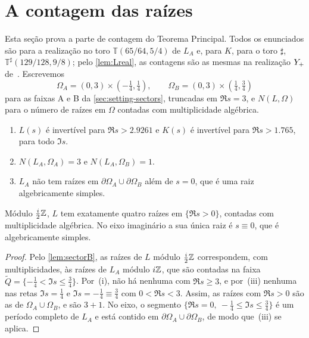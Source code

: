 \section{A contagem das raízes}\label{sec:counting}

Esta seção prova a parte de contagem do Teorema Principal. Todos os enunciados são para a realização no toro
$\mathbb T(65/64,5/4)$ de $L_A$ e, para $K$, para o toro $\sharp$, $\mathbb T^\sharp(129/128,9/8)$; pelo
\cref{lem:Lreal}, as contagens são as mesmas na realização $Y_{+}$ de~\cite{RT2019}. Escrevemos
\[
  \Omega_A=(0,3)\times(-\tfrac14,\tfrac14),\qquad \Omega_B=(0,3)\times(\tfrac14,\tfrac34)
\]
para as faixas A e B da \cref{sec:setting-sectors}, truncadas em $\Re s=3$, e $N(L,\Omega)$ para o
número de raízes em $\Omega$ contadas com multiplicidade algébrica.

\begin{theorem}[Contagens]\label{thm:counts}
\begin{enumerate}[label=\textup{(\roman*)},leftmargin=*]
\item $L(s)$ é invertível para $\Re s>2.9261$ e $K(s)$ é invertível para $\Re s>1.765$, para todo $\Im s$.
\item $N(L_A,\Omega_A)=3$ e $N(L_A,\Omega_B)=1$.
\item $L_A$ não tem raízes em $\partial\Omega_A\cup\partial\Omega_B$ além de $s=0$, que é uma raiz
  algebricamente simples.
\end{enumerate}
\end{theorem}

\begin{corollary}\label{cor:four}
Módulo $\tfrac i2\mathbb{Z}$, $L$ tem exatamente quatro raízes em $\{\Re s>0\}$, contadas com multiplicidade algébrica. No
eixo imaginário a sua única raiz é $s\equiv0$, que é algebricamente simples.
\end{corollary}

\begin{proof}
Pelo \cref{lem:sectorB}, as raízes de $L$ módulo $\tfrac i2\mathbb{Z}$ correspondem, com multiplicidades, às raízes de
$L_A$ módulo $i\mathbb{Z}$, que são contadas na faixa $\widetilde Q=\{-\tfrac14<\Im s\le\tfrac34\}$. Por~(i),
não há nenhuma com $\Re s\ge3$, e por~(iii) nenhuma nas retas $\Im s=\tfrac14$ e $\Im s=-\tfrac14\equiv\tfrac34$
com $0<\Re s<3$. Assim, as raízes com $\Re s>0$ são as de $\Omega_A\cup\Omega_B$, e são $3+1$. No eixo, o
segmento $\{\Re s=0,\ -\tfrac14\le\Im s\le\tfrac34\}$ é um período completo de $L_A$ e está contido
em $\partial\Omega_A\cup\partial\Omega_B$, de modo que~(iii) se aplica.
\end{proof}

